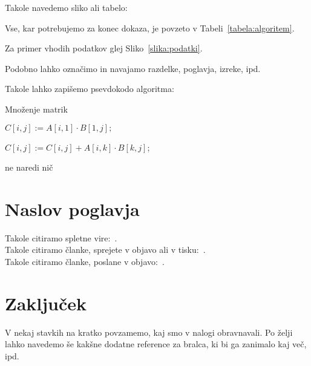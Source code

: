 \documentclass[12pt,a4paper,titlepage,openany]{report}
\begin{document}
\noindent Takole navedemo sliko ali tabelo:

\medskip
Vse, kar potrebujemo za konec dokaza, je povzeto v Tabeli~\ref{tabela:algoritem}.

\medskip
Za primer vhodih podatkov glej Sliko~\ref{slika:podatki}.

\medskip
\noindent Podobno lahko označimo in navajamo razdelke, poglavja, izreke, ipd.


\newpage
Takole lahko zapišemo psevdokodo algoritma:

\begin{algorithm}[h!]\label{algoritem1}
\caption{Množenje matrik}
{
    {
        {
            $C[i,j]:= A[i,1]\cdot B[1,j];$

            {
                $C[i,j]:= C[i,j]+A[i,k]\cdot B[k,j]$;
            }
        }
    }
    {
       ne naredi nič
    }
}
\end{algorithm}


\chapter{Naslov poglavja}
\thispagestyle{fancy}

Takole citiramo spletne vire:~\cite{splet1,splet2,splet3}.\\
Takole citiramo članke, sprejete v objavo ali v tisku:~\cite{Novak,Novak2,Novak3,Novak4}.\\
Takole citiramo članke, poslane v objavo:~\cite{Novak5,Novak6}.

\chapter{Zaključek}
\thispagestyle{fancy}

V nekaj stavkih na kratko povzamemo, kaj smo v nalogi obravnavali.
Po želji lahko navedemo še kakšne dodatne reference za bralca, ki bi ga zanimalo kaj več, ipd.


\end{document}
